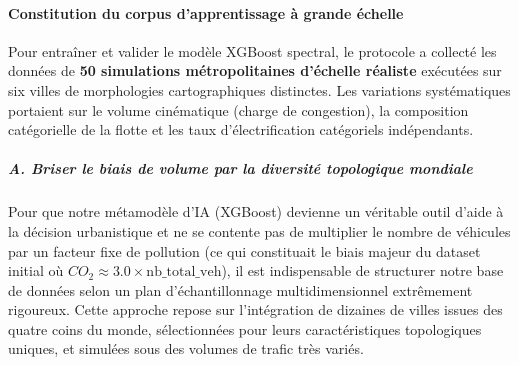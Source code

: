 \documentclass[10pt, a4paper]{article}
\begin{document}
\paragraph{Constitution du corpus d'apprentissage à grande
échelle}\label{constitution-du-corpus-dapprentissage-uxe0-grande-uxe9chelle}

Pour entraîner et valider le modèle XGBoost spectral, le protocole a
collecté les données de \textbf{50 simulations métropolitaines d'échelle
réaliste} exécutées sur six villes de morphologies cartographiques
distinctes. Les variations systématiques portaient sur le volume
cinématique (charge de congestion), la composition catégorielle de la
flotte et les taux d'électrification catégoriels indépendants.

\subparagraph{A. Briser le biais de volume par la diversité topologique
mondiale}\label{a.-briser-le-biais-de-volume-par-la-diversituxe9-topologique-mondiale}

Pour que notre métamodèle d'IA (XGBoost) devienne un véritable outil
d'aide à la décision urbanistique et ne se contente pas de multiplier le
nombre de véhicules par un facteur fixe de pollution (ce qui constituait
le biais majeur du dataset initial où
\(CO_2 \approx 3.0 \times \text{nb\_total\_veh}\)), il est indispensable
de structurer notre base de données selon un plan d'échantillonnage
multidimensionnel extrêmement rigoureux. Cette approche repose sur
l'intégration de dizaines de villes issues des quatre coins du monde,
sélectionnées pour leurs caractéristiques topologiques uniques, et
simulées sous des volumes de trafic très variés.
\end{document}
